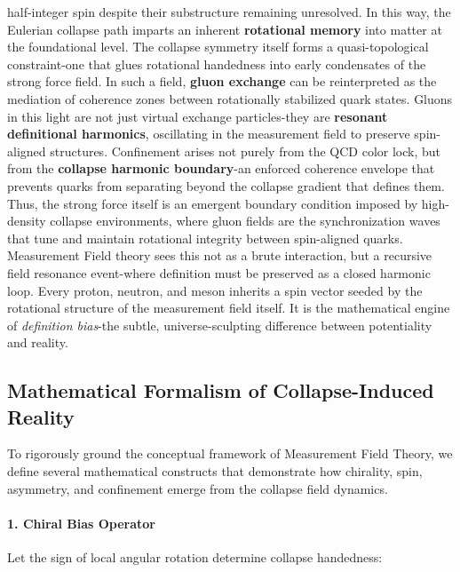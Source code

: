 half-integer spin despite their substructure remaining unresolved. \cite{collapse_foundations} In this way, the Eulerian collapse path imparts an inherent \textbf{rotational memory} into matter at the foundational level. \cite{collapse_foundations} The collapse symmetry itself forms a quasi-topological constraint-one that glues rotational handedness into early condensates of the strong force field. \cite{collapse_foundations} In such a field, \textbf{gluon exchange} can be reinterpreted as the mediation of coherence zones between rotationally stabilized quark states. \cite{collapse_foundations} Gluons in this light are not just virtual exchange particles-they are \textbf{resonant definitional harmonics}, oscillating in the measurement field to preserve spin-aligned structures. \cite{collapse_foundations} Confinement arises not purely from the QCD color lock, but from the \textbf{collapse harmonic boundary}-an enforced coherence envelope that prevents quarks from separating beyond the collapse gradient that defines them. \cite{collapse_foundations} Thus, the strong force itself is an emergent boundary condition imposed by high-density collapse environments, where gluon fields are the synchronization waves that tune and maintain rotational integrity between spin-aligned quarks. \cite{collapse_foundations} Measurement Field theory sees this not as a brute interaction, but a recursive field resonance event-where definition must be preserved as a closed harmonic loop. \cite{collapse_foundations} Every proton, neutron, and meson inherits a spin vector seeded by the rotational structure of the measurement field itself. \cite{collapse_foundations} It is the mathematical engine of \textit{definition bias}-the subtle, universe-sculpting difference between potentiality and reality. \cite{collapse_foundations} \subsection*{Mathematical Formalism of Collapse-Induced Reality}

To rigorously ground the conceptual framework of Measurement Field Theory, we define several mathematical constructs that demonstrate how chirality, spin, asymmetry, and confinement emerge from the collapse field dynamics. \cite{collapse_foundations} \paragraph{1. Chiral Bias Operator}

Let the sign of local angular rotation determine collapse handedness:

